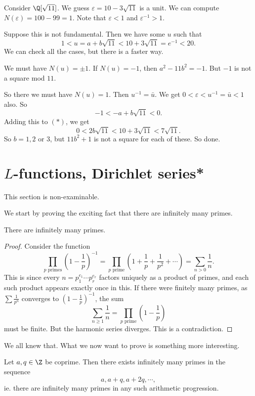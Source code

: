 \documentclass[a4paper]{article}
\begin{document}
\begin{eg}
  Consider $\Q[\sqrt{11}]$. We guess $\varepsilon = 10 - 3\sqrt{11}$ is a unit. We can compute $N(\varepsilon) = 100 - 99 = 1$. Note that $\varepsilon < 1$ and $\varepsilon^{-1} > 1$.

  Suppose this is not fundamental. Then we have some $u$ such that
  \[
    1 < u = a + b\sqrt{11} < 10 + 3\sqrt{11} = e^{-1} < 20.\tag{$*$}
  \]
  We can check all the cases, but there is a faster way.

  We must have $N(u) = \pm 1$. If $N(u) = -1$, then $a^2 - 11b^2 = -1$. But $-1$ is not a square mod $11$.

  So there we must have $N(u) = 1$. Then $u^{-1} = \bar{u}$. We get $0 < \varepsilon < u^{-1} = \bar{u} < 1$ also. So
  \[
    -1 < -a + b\sqrt{11} < 0.
  \]
  Adding this to $(*)$, we get
  \[
    0 < 2b\sqrt{11} < 10 + 3\sqrt{11} < 7\sqrt{11}.
  \]
  So $b = 1, 2$ or $3$, but $11b^2 + 1$ is not a square for each of these. So done.
\end{eg}

\section{\texorpdfstring{$L$}{L}-functions, Dirichlet series*}
This section is non-examinable.

We start by proving the exciting fact that there are infinitely many primes.
\begin{thm}[Euclid]
  There are infinitely many primes.
\end{thm}

\begin{proof}
  Consider the function
  \[
    \prod_{p\text{ primes}} \left(1 - \frac{1}{p}\right)^{-1} = \prod_{p\text{ prime}}\left(1 + \frac{1}{p} + \frac{1}{p^2} + \cdots\right) = \sum_{n > 0}\frac{1}{n}.
  \]
  This is since every $n = p_1^{e_1} \cdots p_r^{e_r}$ factors uniquely as a product of primes, and each such product appears exactly once in this. If there were finitely many primes, as $\sum \frac{1}{p^n}$ converges to $\left(1 - \frac{1}{p}\right)^{-1}$, the sum
  \[
    \sum_{n \geq 1}\frac{1}{n} = \prod_{p\text{ prime}} \left(1 - \frac{1}{p}\right)
  \]
  must be finite. But the harmonic series diverges. This is a contradiction.
\end{proof}

We all knew that. What we now want to prove is something more interesting.
\begin{thm}
  Let $a, q \in \Z$ be coprime. Then there exists infinitely many primes in the sequence
  \[
    a, a + q, a + 2q, \cdots,
  \]
  ie. there are infinitely many primes in any such arithmetic progression.
\end{thm}
\end{document}
